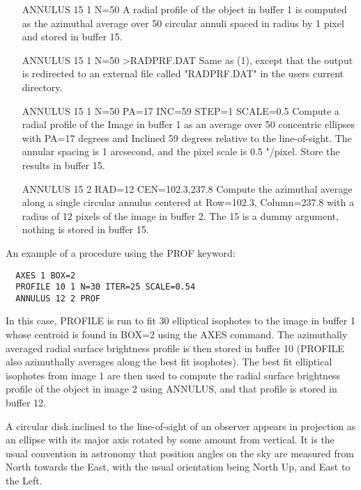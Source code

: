 \begin{itemize}
  \item[ANNULUS 15 1 N=50\hfill]{A radial profile of the object in buffer 1
       is computed as the azimuthal average over 50 circular annuli spaced
       in radius by 1 pixel and stored in buffer 15.}

  \item[ANNULUS 15 1 N=50 >RADPRF.DAT\hfill]{Same as (1), except that the
       output is redirected to an external file called "RADPRF.DAT" in the
       users current directory.}

  \item[ANNULUS 15 1 N=50 PA=17 INC=59 STEP=1 SCALE=0.5\hfill]{Compute a
       radial profile of the Image in buffer 1 as an average over 50
       concentric ellipses with PA=17 degrees and Inclined 59 degrees
       relative to the line-of-sight.  The annular spacing is 1 arcsecond,
       and the pixel scale is 0.5 "/pixel.  Store the results in buffer
       15.}

  \item[ANNULUS 15 2 RAD=12 CEN=102.3,237.8\hfill]{Compute the azimuthal
       average along a single circular annulus centered at Row=102.3,
       Column=237.8 with a radius of 12 pixels of the image in buffer 2.
       The 15 is a dummy argument, nothing is stored in buffer 15.}
\end{itemize}

An example of a procedure using the PROF keyword:
\begin{verbatim}
  AXES 1 BOX=2
  PROFILE 10 1 N=30 ITER=25 SCALE=0.54
  ANNULUS 12 2 PROF
\end{verbatim}
In this case, PROFILE is run to fit 30 elliptical isophotes to the image in
buffer 1 whose centroid is found in BOX=2 using the AXES command. The
azimuthally averaged radial surface brightness profile is then stored in
buffer 10 (PROFILE also azimuthally averages along the best fit
isophotes). The best fit elliptical isophotes from image 1 are then used to
compute the radial surface brightness profile of the object in image 2
using ANNULUS, and that profile is stored in buffer 12.


A circular disk inclined to the line-of-sight of an observer appears in
projection as an ellipse with its major axis rotated by some amount from
vertical.  It is the usual convention in astronomy that position angles on
the sky are measured from North towards the East, with the usual
orientation being North Up, and East to the Left.

